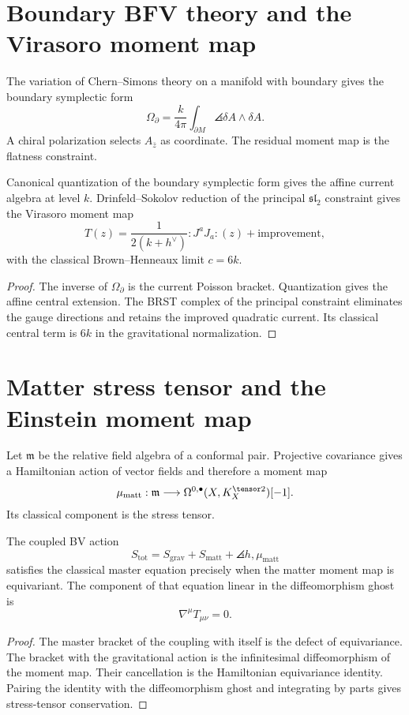 \chapter{Boundary BFV theory and the Virasoro moment map}
The variation of Chern--Simons theory on a manifold with boundary gives the boundary symplectic form
\[
 \Omega_{\partial}=\frac{k}{4\pi}\int_{\partial M}\angles{\delta A\wedge\delta A}.
\]
A chiral polarization selects $A_{\bar z}$ as coordinate.  The residual moment map is the flatness constraint.

\begin{theorem}
Canonical quantization of the boundary symplectic form gives the affine current algebra at level $k$.  Drinfeld--Sokolov reduction of the principal $\mathfrak{sl}_2$ constraint gives the Virasoro moment map
\[
 T(z)=\frac1{2(k+h^\vee)}:J^aJ_a:(z)+\text{improvement},
\]
with the classical Brown--Henneaux limit $c=6k$.
\end{theorem}
\begin{proof}
The inverse of $\Omega_\partial$ is the current Poisson bracket.  Quantization gives the affine central extension.  The BRST complex of the principal constraint eliminates the gauge directions and retains the improved quadratic current.  Its classical central term is $6k$ in the gravitational normalization.
\end{proof}

\chapter{Matter stress tensor and the Einstein moment map}
Let $\mathfrak m$ be the relative field algebra of a conformal pair.  Projective covariance gives a Hamiltonian action of vector fields and therefore a moment map
\[
 \mu_{\mathrm{matt}}:\mathfrak m\longrightarrow
 \Omega^{0,\bullet}(X,K_X^{\tensor2})[-1].
\]
Its classical component is the stress tensor.

\begin{theorem}
The coupled BV action
\[
 S_{\mathrm{tot}}=S_{\mathrm{grav}}+S_{\mathrm{matt}}
 +\angles{h,\mu_{\mathrm{matt}}}
\]
satisfies the classical master equation precisely when the matter moment map is equivariant.  The component of that equation linear in the diffeomorphism ghost is
\[
 \nabla^\mu T_{\mu\nu}=0.
\]
\end{theorem}
\begin{proof}
The master bracket of the coupling with itself is the defect of equivariance.  The bracket with the gravitational action is the infinitesimal diffeomorphism of the moment map.  Their cancellation is the Hamiltonian equivariance identity.  Pairing the identity with the diffeomorphism ghost and integrating by parts gives stress-tensor conservation.
\end{proof}

